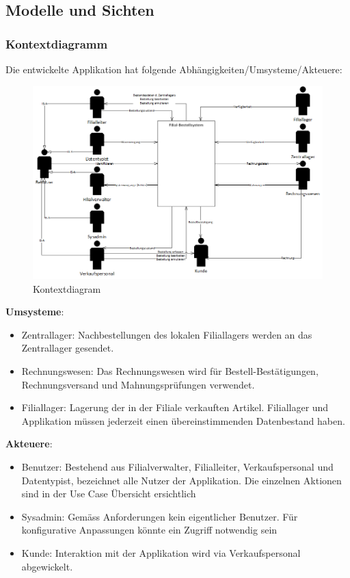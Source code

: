 \subsection{Modelle und Sichten}

\subsubsection{Kontextdiagramm}
Die entwickelte Applikation hat folgende Abhängigkeiten/Umsysteme/Akteuere:
\begin{figure}[H]
	\includegraphics[width=1.0\linewidth]{Images/kontextdiagram}
	\caption{Kontextdiagram}
	\label{fig:kontextdiagram}
\end{figure}

\textbf{Umsysteme}:
\begin{itemize}
\item Zentrallager: Nachbestellungen des lokalen Filiallagers werden an das Zentrallager gesendet.
\item Rechnungswesen: Das Rechnungswesen wird für Bestell-Bestätigungen, Rechnungsversand und Mahnungsprüfungen verwendet.
\item Filiallager: Lagerung der in der Filiale verkauften Artikel. Filiallager und Applikation müssen jederzeit einen übereinstimmenden Datenbestand haben.
\end{itemize}

\textbf{Akteuere}:
\begin{itemize}
\item Benutzer: Bestehend aus Filialverwalter, Filialleiter, Verkaufspersonal und Datentypist, bezeichnet alle Nutzer der Applikation. Die einzelnen Aktionen sind in der Use Case Übersicht ersichtlich
\item Sysadmin: Gemäss Anforderungen kein eigentlicher Benutzer. Für konfigurative Anpassungen könnte ein Zugriff notwendig sein
\item Kunde: Interaktion mit der Applikation wird via Verkaufspersonal abgewickelt.
\end{itemize}


